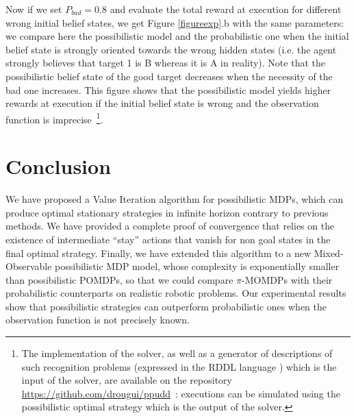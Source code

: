 Now if we set $P_{bad}=0.8$ 
and evaluate the total reward 
at execution for different 
wrong initial belief states, 
we get Figure \ref{figureexp}.b 
with the same parameters: 
we compare here the possibilistic model 
and the probabilistic one 
when the initial belief state 
is strongly oriented 
towards the wrong hidden states 
(i.e. the agent strongly 
believes that target 1 is B 
whereas it is A in reality). 
Note that the possibilistic belief state 
of the good target 
decreases when the necessity of the
bad one increases. 
This figure shows that the possibilistic model 
yields higher rewards at execution 
if the initial belief state is wrong 
and the observation function is imprecise~\footnote{
The implementation of the solver,
as well as a generator of descriptions of such recognition problems
(expressed in the RDDL language \cite{Sanner_relationaldynamic}) 
which is the input of the solver,
are available on the repository \url{https://github.com/drougui/ppudd}~:
executions can be simulated using the possibilistic optimal strategy
which is the output of the solver.}.

\section{Conclusion}
We have proposed a Value Iteration algorithm for possibilistic MDPs, which
can produce optimal stationary strategies in infinite horizon contrary to previous
methods. We have provided a complete proof of convergence that relies on the
existence of intermediate ``stay'' actions that vanish 
for non goal states in the final optimal strategy. 
Finally, we have extended this algorithm to a new Mixed-Observable
possibilistic MDP model, whose complexity is exponentially smaller than
possibilistic POMDPs, so that we could compare $\pi$-MOMDPs with their
probabilistic counterparts on realistic robotic problems. Our experimental
results show that possibilistic strategies can outperform probabilistic 
ones when the observation function is not precisely known.

